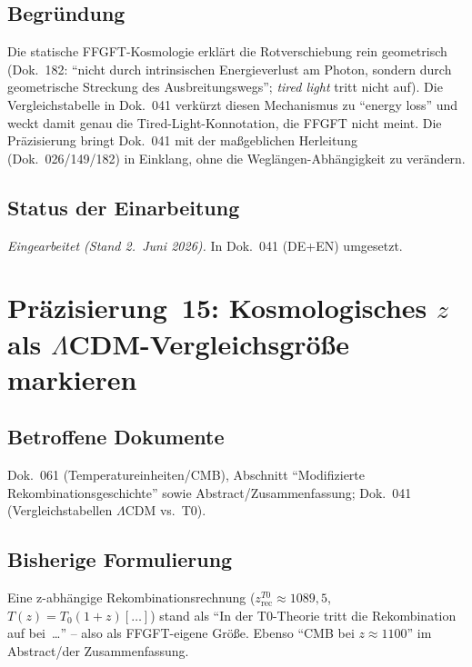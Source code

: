 \subsection*{Begründung}

Die statische FFGFT-Kosmologie erklärt die Rotverschiebung rein geometrisch
(Dok.~182: \enquote{nicht durch intrinsischen Energieverlust am Photon,
sondern durch geometrische Streckung des Ausbreitungswegs}; \emph{tired
light} tritt nicht auf). Die Vergleichstabelle in Dok.~041 verkürzt diesen
Mechanismus zu \enquote{energy loss} und weckt damit genau die
Tired-Light-Konnotation, die FFGFT nicht meint. Die Präzisierung bringt
Dok.~041 mit der maßgeblichen Herleitung (Dok.~026/149/182) in Einklang,
ohne die Weglängen-Abhängigkeit zu verändern.

\subsection*{Status der Einarbeitung}

\emph{Eingearbeitet (Stand 2.~Juni 2026).} In Dok.~041 (DE+EN) umgesetzt.

\section{\texorpdfstring{Präzisierung~15: Kosmologisches $z$ als $\Lambda$CDM-Vergleichsgröße markieren}{Praezisierung 15: Kosmologisches z als LambdaCDM-Vergleichsgroesse markieren}}

\subsection*{Betroffene Dokumente}

Dok.~061 (Temperatureinheiten/CMB), Abschnitt \enquote{Modifizierte
Rekombinationsgeschichte} sowie Abstract/Zusammenfassung; Dok.~041
(Vergleichstabellen $\Lambda$CDM vs.\ T0).

\subsection*{Bisherige Formulierung}

Eine z-abhängige Rekombinationsrechnung ($z_{\text{rec}}^{T0}\approx 1089{,}5$,
$T(z)=T_0(1+z)[\dots]$) stand als \enquote{In der T0-Theorie tritt die
Rekombination auf bei~\dots} -- also als FFGFT-eigene Größe. Ebenso
\enquote{CMB bei $z\approx 1100$} im Abstract/der Zusammenfassung.

